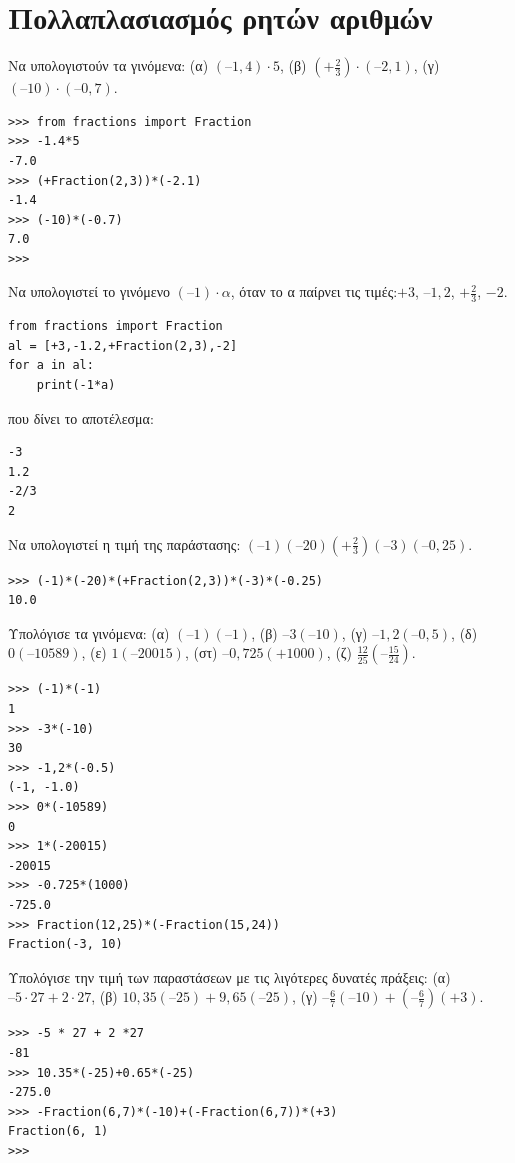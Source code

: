 \section{Πολλαπλασιασμός ρητών αριθμών}
\begin{exercise}
Nα  υπολογιστούν  τα  γινόμενα: (α) $(–1,4)\cdot 5$,    (β) $\left(+ \frac{2}{3}\right)\cdot(–2,1)$,      (γ) $(–10)\cdot(–0,7)$.
\end{exercise}
\begin{lstlisting}
>>> from fractions import Fraction
>>> -1.4*5
-7.0
>>> (+Fraction(2,3))*(-2.1)
-1.4
>>> (-10)*(-0.7)
7.0
>>>
\end{lstlisting}
\begin{exercise}
Nα  υπολογιστεί το  γινόμενο  $(–1)\cdot α$,  όταν  το  α παίρνει τις τιμές:$+3$, $–1,2$, $+\frac{2}{3}$, $-2$.
\end{exercise}
\begin{lstlisting}
from fractions import Fraction
al = [+3,-1.2,+Fraction(2,3),-2]
for a in al:
    print(-1*a)
\end{lstlisting}
που δίνει το αποτέλεσμα:
\begin{lstlisting}
-3
1.2
-2/3
2
\end{lstlisting}
\begin{exercise}
Να  υπολογιστεί η τιμή  της παράστασης: $(–1)(–20)(+ \frac{2}{3} )(–3)(–0,25)$.
\end{exercise}
\begin{lstlisting}
>>> (-1)*(-20)*(+Fraction(2,3))*(-3)*(-0.25)
10.0
\end{lstlisting}
\begin{exercise}
 Υπολόγισε  τα  γινόμενα: (α) $(–1)(–1)$, (β) $–3(–10)$,  (γ) $–1,2(–0,5)$, (δ) $0(–10589)$,
(ε) $1(–20015)$,  (στ)  $–0,725(+1000)$,  (ζ)  $\frac{12}{25} \left(–\frac{ 15}{24}\right)$.
\end{exercise}
\begin{lstlisting}
>>> (-1)*(-1)
1
>>> -3*(-10)
30
>>> -1,2*(-0.5)
(-1, -1.0)
>>> 0*(-10589)
0
>>> 1*(-20015)
-20015
>>> -0.725*(1000)
-725.0
>>> Fraction(12,25)*(-Fraction(15,24))
Fraction(-3, 10)
\end{lstlisting}
\begin{exercise}
Υπολόγισε την τιμή  των παραστάσεων με  τις λιγότερες δυνατές πράξεις:
(α) $–5\cdot 27 + 2\cdot 27$,   (β) $10,35(–25) + 9,65(–25)$,   (γ) $– \frac{6}{7} (–10)+(–\frac{6}{7} )(+3)$.
\end{exercise}
\begin{lstlisting}
>>> -5 * 27 + 2 *27
-81
>>> 10.35*(-25)+0.65*(-25)
-275.0
>>> -Fraction(6,7)*(-10)+(-Fraction(6,7))*(+3)
Fraction(6, 1)
>>>
\end{lstlisting}
